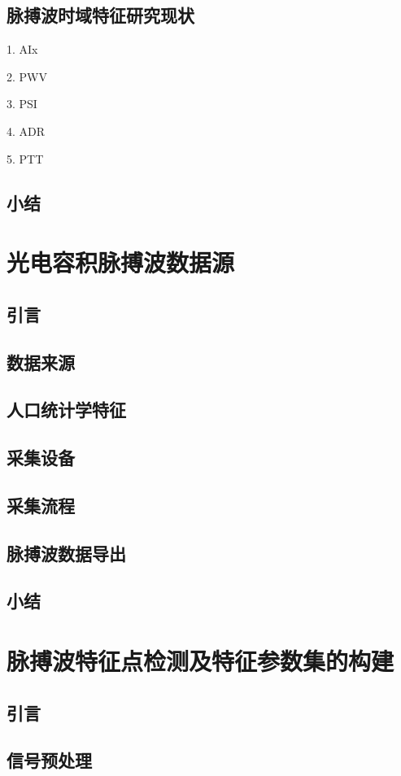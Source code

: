 \section{脉搏波时域特征研究现状}
1. AIx

2. PWV

3. PSI

4. ADR

5. PTT


\section{小结}

\chapter{光电容积脉搏波数据源}
\section{引言}
\section{数据来源}
\section{人口统计学特征}
\section{采集设备}
\section{采集流程}
\section{脉搏波数据导出}
\section{小结}


\chapter{脉搏波特征点检测及特征参数集的构建}
\section{引言}
\section{信号预处理}
